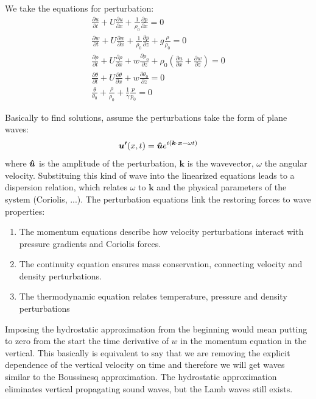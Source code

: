 We take the equations for perturbation:
\begin{align*}
	\frac{\partial u}{\partial t}+U\frac{\partial u}{\partial x}+\frac{1}{\rho_0}\frac{\partial p}{\partial x}=0                                                              \\
	\frac{\partial w}{\partial t}+U\frac{\partial w}{\partial x}+\frac{1}{\rho_0}\frac{\partial p}{\partial z}+g\frac{\rho}{\rho_0}=0                                         \\
	\frac{\partial\rho}{\partial t}+U\frac{\partial\rho}{\partial x}+w\frac{\partial\rho_0}{\partial z}+\rho_0(\frac{\partial u}{\partial x}+\frac{\partial w}{\partial z})=0 \\
	\frac{\partial\theta}{\partial t}+U\frac{\partial\theta}{\partial x}+w\frac{\partial\theta_0}{\partial z}=0                                                               \\
	\frac{\theta}{\theta_0}+\frac{\rho}{\rho_0}+\frac{1}{\gamma}\frac{p}{p_0}=0
\end{align*}

Basically to find solutions, assume the perturbations take the form of plane waves:
\[\bm{u'}(x,t)=\bm{\hat{\bm{u}}}e^{i(\bm{k}\cdot\bm{x}-\omega t)}\]
where $\bm{\bm{\hat{u}}}$ is the amplitude of the perturbation, $\bm{k}$ is the wavevector, $\omega$ the angular velocity. Substituing this kind of wave into the linearized equations leads to a dispersion relation, which relates $\omega$ to $\bm{k}$ and the physical parameters of the system (Coriolis, ...).
The perturbation equations link the restoring forces to wave properties:
\begin{enumerate}
	\item The momentum equations describe how velocity perturbations interact with pressure gradients and Coriolis forces.
	\item The continuity equation ensures mass conservation, connecting velocity and density perturbations.
	\item The thermodynamic equation relates temperature, pressure and density perturbations
\end{enumerate}
Imposing the hydrostatic approximation from the beginning would mean putting to zero from the start the time derivative of $w$ in the momentum equation in the vertical. This basically is equivalent to say that we are removing the explicit dependence of the vertical velocity on time and therefore we will get waves similar to the Boussinesq approximation. The hydrostatic approximation eliminates vertical propagating sound waves, but the Lamb waves still exists.


